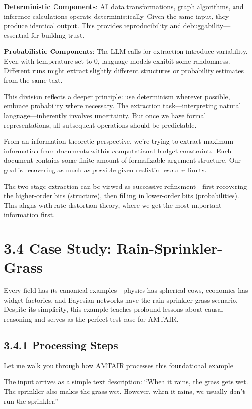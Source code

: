 \documentclass[
  11pt,
  letterpaper,
]{book}
\begin{document}
\textbf{Deterministic Components}: All data transformations, graph
algorithms, and inference calculations operate deterministically. Given
the same input, they produce identical output. This provides
reproducibility and debuggability---essential for building trust.

\textbf{Probabilistic Components}: The LLM calls for extraction
introduce variability. Even with temperature set to 0, language models
exhibit some randomness. Different runs might extract slightly different
structures or probability estimates from the same text.

This division reflects a deeper principle: use determinism wherever
possible, embrace probability where necessary. The extraction
task---interpreting natural language---inherently involves uncertainty.
But once we have formal representations, all subsequent operations
should be predictable.

From an information-theoretic perspective, we're trying to extract
maximum information from documents within computational budget
constraints. Each document contains some finite amount of formalizable
argument structure. Our goal is recovering as much as possible given
realistic resource limits.

The two-stage extraction can be viewed as successive refinement---first
recovering the higher-order bits (structure), then filling in
lower-order bits (probabilities). This aligns with rate-distortion
theory, where we get the most important information first.

\section{3.4 Case Study:
Rain-Sprinkler-Grass}\label{sec-case-rain-sprinkler}

Every field has its canonical examples---physics has spherical cows,
economics has widget factories, and Bayesian networks have the
rain-sprinkler-grass scenario. Despite its simplicity, this example
teaches profound lessons about causal reasoning and serves as the
perfect test case for AMTAIR.

\subsection{3.4.1 Processing Steps}\label{sec-rsg-processing}

Let me walk you through how AMTAIR processes this foundational example:

The input arrives as a simple text description: ``When it rains, the
grass gets wet. The sprinkler also makes the grass wet. However, when it
rains, we usually don't run the sprinkler.''
\end{document}
